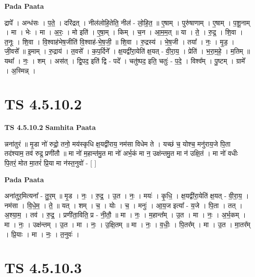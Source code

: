 \documentclass[17pt]{extarticle}
\begin{document}
\textbf{Pada Paata} \newline

द्रापे᳚ । अन्ध॑सः । प॒ते॒ । दरि॑द्रत् । नील॑लोहि॒तेति॒ नील॑ - लो॒हि॒त॒ ॥ ए॒षाम् । पुरु॑षाणाम् । ए॒षाम् । प॒शू॒नाम् । मा । भेः । मा । अ॒रः॒ । मो इति॑ । ए॒षा॒म् । किम् । च॒न । आ॒म॒म॒त् ॥ या । ते॒ । रु॒द्र॒ । शि॒वा । त॒नूः । शि॒वा । वि॒श्वाह॑भेष॒जीति॑ वि॒श्वाह॑-भे॒ष॒जी॒ ॥ शि॒वा । रु॒द्रस्य॑ । भे॒ष॒जी । तया᳚ । नः॒ । मृ॒ड॒ । जी॒वसे᳚ ॥ इ॒माम् । रु॒द्राय॑ । त॒वसे᳚ । क॒प॒र्दिने᳚ । क्ष॒यद्वी॑रा॒येति॑ क्ष॒यत् - वी॒रा॒य॒ । प्रेति॑ । भ॒रा॒म॒हे॒ । म॒तिम् ॥ यथा᳚ । नः॒ । शम् । अस॑त् । द्वि॒पद॒ इति॑ द्वि - पदे᳚ । चतु॑ष्पद॒ इति॒ चतुः॑ - प॒दे॒ । विश्व᳚म् । पु॒ष्टम् । ग्रामे᳚ । अ॒स्मिन्न् ।  \newline




\section*{ TS 4.5.10.2 }

\textbf{TS 4.5.10.2 } \newline
\textbf{Samhita Paata} \newline

न्नना॑तुरं ॥ मृ॒डा नो॑ रुद्रो॒ तनो॒ मय॑स्कृधि क्ष॒यद्वी॑राय॒ नम॑सा विधेम ते । यच्छं च॒ योश्च॒ मनु॑राय॒जे पि॒ता तद॑श्याम॒ तव॑ रुद्र॒ प्रणी॑तौ ॥ मा नो॑ म॒हान्त॑मु॒त मा नो॑ अर्भ॒कं मा न॒ उक्ष॑न्तमु॒त मा न॑ उक्षि॒तं । मा नो॑ वधीः पि॒तरं॒ मोत मा॒तरं॑ प्रि॒या मा न॑स्त॒नुवो॑ - [  ] \newline

\textbf{Pada Paata} \newline

अना॑तुर॒मित्यना᳚ - तु॒र॒म् ॥ मृ॒ड । नः॒ । रु॒द्र॒ । उ॒त । नः॒ । मयः॑ । कृ॒धि॒ । क्ष॒यद्वी॑रा॒येति॑ क्ष॒यत् - वी॒रा॒य॒ । नम॑सा । वि॒धे॒म॒ । ते॒ ॥ यत् । शम् । च॒ । योः । च॒ । मनुः॑ । आ॒य॒ज इत्या᳚ - य॒जे । पि॒ता । तत् । अ॒श्या॒म॒ । तव॑ । रु॒द्र॒ । प्रणी॑ता॒विति॒ प्र - नी॒तौ॒ ॥ मा । नः॒ । म॒हान्त᳚म् । उ॒त । मा । नः॒ । अ॒र्भ॒कम् । मा । नः॒ । उक्ष॑न्तम् । उ॒त । मा । नः॒ । उ॒क्षि॒तम् ॥ मा । नः॒ । व॒धीः॒ । पि॒तर᳚म् । मा । उ॒त । मा॒तर᳚म् । प्रि॒याः । मा । नः॒ । त॒नुवः॑ ।  \newline




\section*{ TS 4.5.10.3 }
\end{document}

